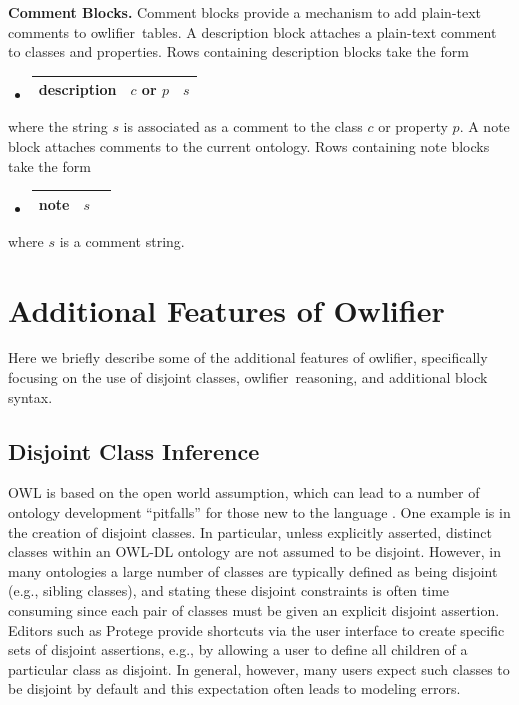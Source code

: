 \documentclass[5p,authoryear]{elsarticle}
\newcommand{\Owlifier}{\textsf{Owlifier}}
\newcommand{\owlifier}{\textsf{owlifier}}
\newcommand{\myblock}[1]{\vspace{12pt}\noindent\textbf{#1}}
\begin{document}
\myblock{Comment Blocks.} Comment blocks provide a mechanism to add
plain-text comments to \owlifier\ tables. A description block attaches
a plain-text comment to classes and properties. Rows containing
description blocks take the form
\begin{itemize}
\item[]
  \begin{tabular}{|l|l|l|}\hline \textsf{description} & $c$ or $p$ & $s$
    \\ \hline
  \end{tabular}
\end{itemize}
where the string $s$ is associated as a comment to the class $c$ or
property $p$. A note block attaches comments to the current
ontology. Rows containing note blocks take the form
\begin{itemize}
\item[]
  \begin{tabular}{|l|l|l|}\hline \textsf{note} & $s$
\\ \hline
  \end{tabular}
\end{itemize}
where $s$ is a comment string.


\section{Additional Features of \Owlifier}
\label{sec:features}

Here we briefly describe some of the additional features of \owlifier,
specifically focusing on the use of disjoint classes, \owlifier\
reasoning, and additional block syntax.
 
\subsection{Disjoint Class Inference}

OWL is based on the open world assumption, which can lead to a number
of ontology development ``pitfalls'' for those new to the language
\cite{smith04:_owl_web_ontol_languag_guide,rector04:_owl_pizzas}. One
example is in the creation of disjoint classes.  In particular, unless
explicitly asserted, distinct classes within an OWL-DL ontology are
not assumed to be disjoint. However, in many ontologies a large number
of classes are typically defined as being disjoint (e.g., sibling
classes), and stating these disjoint constraints is often
time consuming since each pair of classes must be given an explicit
disjoint assertion. Editors such as Protege
\cite{knublauch04:_editin_descr_logic_ontol_with} provide shortcuts
via the user interface to create specific sets of disjoint assertions,
e.g., by allowing a user to define all children of a particular class
as disjoint. In general, however, many users expect such classes to be
disjoint by default \cite{rector04:_owl_pizzas} and this expectation
often leads to modeling errors.
\end{document}
